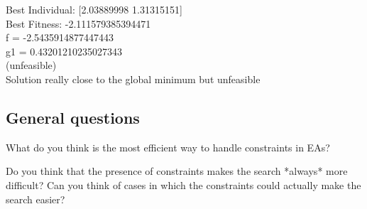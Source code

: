 \begin{figure}[H]
\begin{subfigure}[t]{0.5\textwidth}
    \end{subfigure}
\end{figure}
Best Individual: [2.03889998 1.31315151] \\
Best Fitness: -2.111579385394471 \\
f  = -2.5435914877447443 \\
g1 = 0.43201210235027343 \\
(unfeasible)\\
Solution really close to the global minimum but unfeasible


\subsection{General questions}
What do you think is the most efficient way to handle constraints in EAs?


Do you think that the presence of constraints makes the search *always* more difficult? Can you think of cases in which the constraints could actually make the search easier?